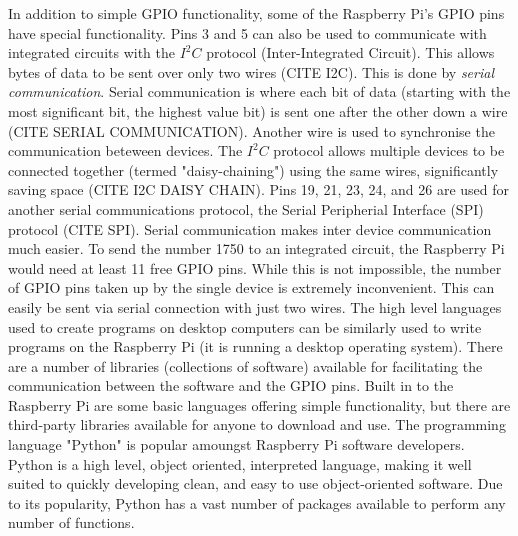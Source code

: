 \documentclass{report}
\begin{document}
	In addition to simple GPIO functionality, some of the Raspberry Pi's GPIO pins have special functionality. Pins 3 and 5 can also be used to communicate with integrated circuits with the \(I^2 C\) protocol (Inter-Integrated Circuit). This allows bytes of data to be sent over only two wires (CITE I2C). This is done by \textit{serial communication}. Serial communication is where each bit of data (starting with the most significant bit, the highest value bit) is sent one after the other down a wire (CITE SERIAL COMMUNICATION). Another wire is used to synchronise the communication beteween devices. The \(I^2 C\) protocol allows multiple devices to be connected together (termed "daisy-chaining") using the same wires, significantly saving space (CITE I2C DAISY CHAIN). Pins 19, 21, 23, 24, and 26 are used for another serial communications protocol, the Serial Peripherial Interface (SPI) protocol (CITE SPI). Serial communication makes inter device communication much easier. To send the number 1750 to an integrated circuit, the Raspberry Pi would need at least 11 free GPIO pins. While this is not impossible, the number of GPIO pins taken up by the single device is extremely inconvenient. This can easily be sent via serial connection with just two wires.\newline \newline  \noindent
	The high level languages used to create programs on desktop computers can be similarly used to write programs on the Raspberry Pi (it is running a desktop operating system). There are a number of libraries (collections of software) available for facilitating the communication between the software and the GPIO pins. Built in to the Raspberry Pi are some basic languages offering simple functionality, but there are third-party libraries available for anyone to download and use\cite{pilibswiringpi, pilibspigpio}. The programming language "Python" is popular amoungst Raspberry Pi software developers. Python is a high level, object oriented, interpreted language, making it well suited to quickly developing clean, and easy to use object-oriented software. Due to its popularity, Python has a vast number of packages available to perform any number of functions.
\end{document}

